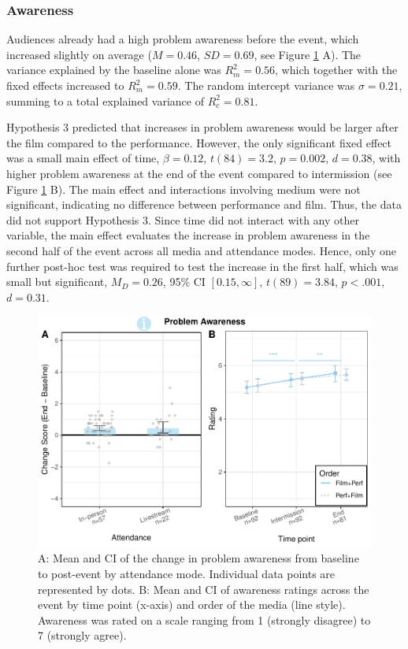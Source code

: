 \documentclass[
  man,floatsintext]{apa6}
\begin{document}
\subsubsection{Awareness}\label{awareness}

Audiences already had a high problem awareness before the event, which increased slightly on average (\(M = 0.46\), \(SD = 0.69\), see Figure \ref{fig:awareness-plots} A). The variance explained by the baseline alone was \(R_{m}^2 = 0.56\), which together with the fixed effects increased to \(R_{m}^2 = 0.59\). The random intercept variance was \(\sigma = 0.21\), summing to a total explained variance of \(R_{c}^2 = 0.81\).

Hypothesis 3 predicted that increases in problem awareness would be larger after the film compared to the performance. However, the only significant fixed effect was a small main effect of time, \(\beta = 0.12\), \(t (84) = 3.2\), \(p = 0.002\), \(d = 0.38\), with higher problem awareness at the end of the event compared to intermission (see Figure \ref{fig:awareness-plots} B). The main effect and interactions involving medium were not significant, indicating no difference between performance and film. Thus, the data did not support Hypothesis 3. Since time did not interact with any other variable, the main effect evaluates the increase in problem awareness in the second half of the event across all media and attendance modes. Hence, only one further post-hoc test was required to test the increase in the first half, which was small but significant, \(M_D = 0.26\), 95\% CI \([0.15, \infty]\), \(t(89) = 3.84\), \(p < .001\), \(d = 0.31\).



\begin{figure}
\includegraphics[width=1\linewidth]{Schlichting_MSc_Thesis_files/figure-latex/awareness-plots-1} \caption{A: Mean and CI of the change in problem awareness from baseline to post-event by attendance mode. Individual data points are represented by dots. B: Mean and CI of awareness ratings across the event by time point (x-axis) and order of the media (line style). Awareness was rated on a scale ranging from 1 (strongly disagree) to 7 (strongly agree).}\label{fig:awareness-plots}
\end{figure}
\end{document}
